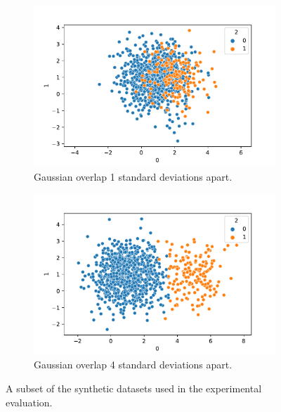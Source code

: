 \begin{figure}{}
\begin{subfigure}[b]{0.24\textwidth}
        \includegraphics[width=\textwidth]{plots/synthetic_dataset_visualizations/gaussian_overlap_0.83_0.17_1000_1_1.csv.pdf}
        \caption[Network2]%
        {{\small Gaussian overlap 1 standard deviations apart.}}    
        \label{fig:synthetic_dataset_gaussian_1}
    \end{subfigure}
    \hfill
    \begin{subfigure}[b]{0.24\textwidth}  
        \centering 
        \includegraphics[width=\textwidth]{plots/synthetic_dataset_visualizations/gaussian_overlap_0.83_0.17_1000_1_4.csv.pdf}
        \caption[]%
        {{\small Gaussian overlap 4 standard deviations apart.}}    
        \label{fig:synthetic_dataset_gaussian_4}
    \end{subfigure}
    \caption[]{\label{fig:synthetic-datasets-one} A subset of the synthetic datasets used in the experimental evaluation.}
\end{figure}
